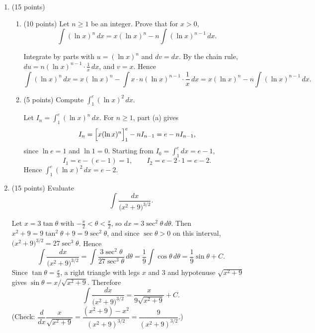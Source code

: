\documentclass[12pt,letterpaper]{article}
\newcommand{\points}[1]{(#1 points)}
\newcommand{\workspace}{\vfill\newpage}
\begin{document}
\begin{enumerate}[label=\textbf{\arabic*.},leftmargin=2em]
  \item \points{15}
    \begin{enumerate}[label=(\alph*)]
      \item \points{10} Let $n\ge1$ be an integer. Prove that for $x>0$,
        \[
          \int(\ln x)^n\,dx=x(\ln x)^n-n\int(\ln x)^{n-1}\,dx.
        \]

        \begin{solution}
          Integrate by parts with $u=(\ln x)^n$ and $dv=dx$. By the chain
          rule, $du=n(\ln x)^{n-1}\cdot\frac1x\,dx$, and $v=x$. Hence
          \[
            \int(\ln x)^n\,dx
            =x(\ln x)^n-\int x\cdot n(\ln x)^{n-1}\cdot\frac1x\,dx
            =x(\ln x)^n-n\int(\ln x)^{n-1}\,dx.
          \]
        \end{solution}
        \vfill

      \item \points{5} Compute $\displaystyle\int_1^e(\ln x)^2\,dx$.

        \begin{solution}
          Let $I_n=\int_1^e(\ln x)^n\,dx$. For $n\ge1$, part (a) gives
          \[
            I_n=\Bigl[x(\ln x)^n\Bigr]_1^e-nI_{n-1}=e-nI_{n-1},
          \]
          since $\ln e=1$ and $\ln 1=0$. Starting from
          $I_0=\int_1^e dx=e-1$,
          \[
            I_1=e-(e-1)=1,\qquad I_2=e-2\cdot1=e-2.
          \]
          Hence $\displaystyle\int_1^e(\ln x)^2\,dx=e-2$.
        \end{solution}
        \vfill
    \end{enumerate}
    \newpage

  \item \points{15}
    Evaluate
    \[
      \int\frac{dx}{\bigl(x^2+9\bigr)^{3/2}}.
    \]

    \begin{solution}
      Let $x=3\tan\theta$ with $-\frac\pi2<\theta<\frac\pi2$, so
      $dx=3\sec^2\theta\,d\theta$. Then
      $x^2+9=9\tan^2\theta+9=9\sec^2\theta$, and since $\sec\theta>0$ on
      this interval, $\bigl(x^2+9\bigr)^{3/2}=27\sec^3\theta$. Hence
      \[
        \int\frac{dx}{\bigl(x^2+9\bigr)^{3/2}}
        =\int\frac{3\sec^2\theta}{27\sec^3\theta}\,d\theta
        =\frac19\int\cos\theta\,d\theta
        =\frac19\sin\theta+C.
      \]
      Since $\tan\theta=\frac x3$, a right triangle with legs $x$ and $3$
      and hypotenuse $\sqrt{x^2+9}$ gives
      $\sin\theta=x/\sqrt{x^2+9}$. Therefore
      \[
        \int\frac{dx}{\bigl(x^2+9\bigr)^{3/2}}=\frac{x}{9\sqrt{x^2+9}}+C.
      \]
      (Check: $\dfrac{d}{dx}\dfrac{x}{\sqrt{x^2+9}}
      =\dfrac{(x^2+9)-x^2}{(x^2+9)^{3/2}}=\dfrac{9}{(x^2+9)^{3/2}}$.)
    \end{solution}
    \workspace


\end{enumerate}
\end{document}
